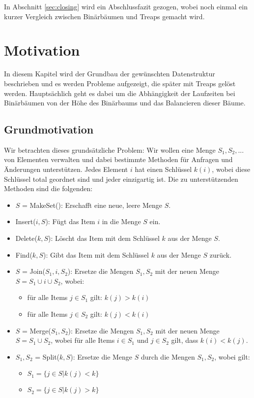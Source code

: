 \documentclass[a4paper]{scrreprt}
\theoremstyle{definition}
\begin{document}

In Abschnitt \ref{sec:closing} wird ein Abschlussfazit gezogen, wobei noch einmal ein kurzer Vergleich zwischen Binärbäumen und Treaps gemacht wird. %

\chapter{Motivation}
\label{sec:motivation}

In diesem Kapitel wird der Grundbau der gewünschten Datenstruktur beschrieben und es werden Probleme aufgezeigt, die später mit Treaps gelöst werden.
Hauptsächlich geht es dabei um die Abhängigkeit der Laufzeiten bei Binärbäumen von der Höhe des Binärbaums und das Balancieren dieser Bäume.

\section{Grundmotivation}
\label{sec:motivationbasics}

Wir betrachten dieses grundsätzliche Problem:
Wir wollen eine Menge ${S_1, S_2, ...}$ von Elementen verwalten und dabei bestimmte Methoden für Anfragen und Änderungen unterstützen.
Jedes Element $i$ hat einen Schlüssel $k(i)$, wobei diese Schlüssel total geordnet sind und jeder einzigartig ist.
Die zu unterstützenden Methoden sind die folgenden:

\begin{itemize}
\item $S$ = MakeSet(): Erschafft eine neue, leere Menge $S$.
\item Insert($i, S$): Fügt das Item $i$ in die Menge $S$ ein.
\item Delete($k, S$): Löscht das Item mit dem Schlüssel $k$ aus der Menge $S$.
\item Find($k, S$): Gibt das Item mit dem Schlüssel $k$ aus der Menge $S$ zurück.
\item $S$ = Join($S_1, i, S_2$): Ersetze die Mengen $S_1, S_2$ mit der neuen Menge $S = S_1 \cup {i} \cup S_2$, wobei:
	\begin{itemize}
	\item für alle Items $j \in S_1$ gilt: $k(j) > k(i)$
	\item für alle Items $j \in S_2$ gilt: $k(j) < k(i)$
	\end{itemize} 
\item $S$ = Merge($S_1, S_2$): Ersetze die Mengen $S_1, S_2$ mit der neuen Menge $S = S_1 \cup S_2$, wobei für alle Items $i \in S_1$ und $j \in S_2$ gilt, dass $k(i) < k(j)$.
\item $S_1, S_2$ = Split($k, S$): Ersetze die Menge $S$ durch die Mengen $S_1, S_2$, wobei gilt:
	\begin{itemize}
	\item $S_1 = \{j \in S | k(j) < k\}$
	\item $S_2 = \{j \in S | k(j) > k\}$
	\end{itemize}
\end{itemize}
\end{document}
